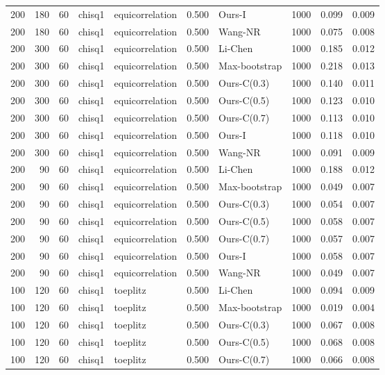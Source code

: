 \begin{tabular}{rrrllrlrrr}
200 & 180 & 60 & chisq1 & equicorrelation & 0.500 & Ours-I & 1000 & 0.099 & 0.009 \\
200 & 180 & 60 & chisq1 & equicorrelation & 0.500 & Wang-NR & 1000 & 0.075 & 0.008 \\
200 & 300 & 60 & chisq1 & equicorrelation & 0.500 & Li-Chen & 1000 & 0.185 & 0.012 \\
200 & 300 & 60 & chisq1 & equicorrelation & 0.500 & Max-bootstrap & 1000 & 0.218 & 0.013 \\
200 & 300 & 60 & chisq1 & equicorrelation & 0.500 & Ours-C(0.3) & 1000 & 0.140 & 0.011 \\
200 & 300 & 60 & chisq1 & equicorrelation & 0.500 & Ours-C(0.5) & 1000 & 0.123 & 0.010 \\
200 & 300 & 60 & chisq1 & equicorrelation & 0.500 & Ours-C(0.7) & 1000 & 0.113 & 0.010 \\
200 & 300 & 60 & chisq1 & equicorrelation & 0.500 & Ours-I & 1000 & 0.118 & 0.010 \\
200 & 300 & 60 & chisq1 & equicorrelation & 0.500 & Wang-NR & 1000 & 0.091 & 0.009 \\
200 & 90 & 60 & chisq1 & equicorrelation & 0.500 & Li-Chen & 1000 & 0.188 & 0.012 \\
200 & 90 & 60 & chisq1 & equicorrelation & 0.500 & Max-bootstrap & 1000 & 0.049 & 0.007 \\
200 & 90 & 60 & chisq1 & equicorrelation & 0.500 & Ours-C(0.3) & 1000 & 0.054 & 0.007 \\
200 & 90 & 60 & chisq1 & equicorrelation & 0.500 & Ours-C(0.5) & 1000 & 0.058 & 0.007 \\
200 & 90 & 60 & chisq1 & equicorrelation & 0.500 & Ours-C(0.7) & 1000 & 0.057 & 0.007 \\
200 & 90 & 60 & chisq1 & equicorrelation & 0.500 & Ours-I & 1000 & 0.058 & 0.007 \\
200 & 90 & 60 & chisq1 & equicorrelation & 0.500 & Wang-NR & 1000 & 0.049 & 0.007 \\
100 & 120 & 60 & chisq1 & toeplitz & 0.500 & Li-Chen & 1000 & 0.094 & 0.009 \\
100 & 120 & 60 & chisq1 & toeplitz & 0.500 & Max-bootstrap & 1000 & 0.019 & 0.004 \\
100 & 120 & 60 & chisq1 & toeplitz & 0.500 & Ours-C(0.3) & 1000 & 0.067 & 0.008 \\
100 & 120 & 60 & chisq1 & toeplitz & 0.500 & Ours-C(0.5) & 1000 & 0.068 & 0.008 \\
100 & 120 & 60 & chisq1 & toeplitz & 0.500 & Ours-C(0.7) & 1000 & 0.066 & 0.008 \\

\end{tabular}
